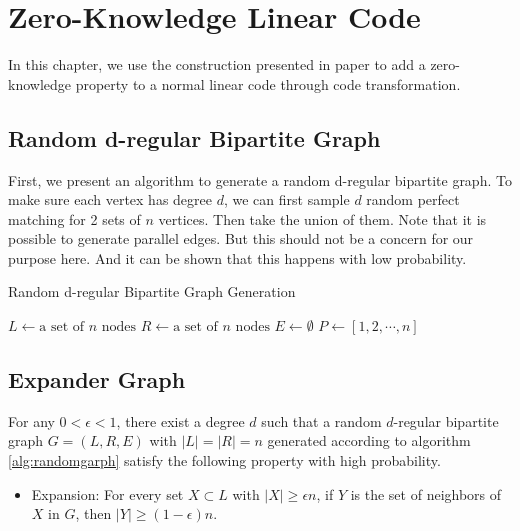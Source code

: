 \chapter{Zero-Knowledge Linear Code}

In this chapter, we use the construction presented in paper \cite{10.1145/2554797.2554815} to add a zero-knowledge property to a normal linear code through code transformation. 

\section{Random d-regular Bipartite Graph}
\label{sec:randomgraph}
First, we present an algorithm to generate a random d-regular bipartite graph. To make sure each vertex has degree $d$, we can first sample $d$ random perfect matching for 2 sets of $n$ vertices. Then take the union of them. Note that it is possible to generate parallel edges. But this should not be a concern for our purpose here. And it can be shown that this happens with low probability.

{}
\begin{algorithm}[hbt!]
\caption{Random d-regular Bipartite Graph Generation}
\label{alg:randomgarph}

$L \gets \text{a set of } n \text{ nodes}$\;
$R \gets \text{a set of } n \text{ nodes}$\;
$E \gets \emptyset$\;
$P \gets [1, 2, \cdots , n]$\;
\end{algorithm}


\section{Expander Graph}

\begin{lemma}
\label{lemma:randomgraph}

For any $0 < \epsilon < 1$, there exist a degree $d$ such that a random $d$-regular bipartite graph $G=(L, R, E)$ with $|L| = |R| = n$ generated according to algorithm \ref{alg:randomgarph} satisfy the following property with high probability.

    \begin{itemize}
        \item Expansion: For every set $X \subset L$ with $|X| \ge \epsilon n$, if $Y$ is the set of neighbors of $X$ in $G$, then $|Y| \ge (1 - \epsilon)  n$.
    \end{itemize}

\end{lemma}

